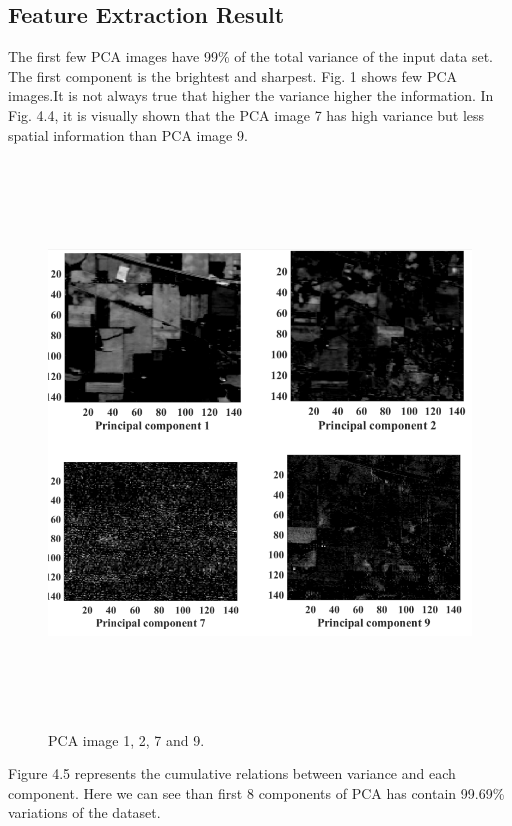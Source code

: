 \documentclass[document.tex]{subfiles}
\begin{document}
\subsection{Feature Extraction Result}
The first few PCA images  have 99\% of the total variance of the input data set. The first component is the brightest and sharpest.
Fig. 1 shows few PCA images.It is not always true that higher the variance higher the information. In Fig. 4.4, it is visually shown that the PCA image 7 has high variance but less spatial information than PCA image 9. 
\begin{figure}[H]
	\begin{center}
		\includegraphics[height=15.0cm]{imgs/PC.png}
	\end{center}
	\caption{PCA image 1, 2, 7 and 9.}
	\label{fig:Some principal components}
\end{figure}
\noindent Figure 4.5 represents the cumulative relations between variance and each component. Here we can see than first 8 components of PCA has contain 99.69\% variations of the dataset.
\end{document}
